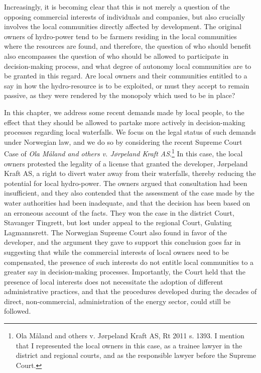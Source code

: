 Increasingly, it is becoming clear that this is not merely a question of the opposing commercial interests of individuals and companies, but also crucially involves the local communities directly affected by development. The original owners of hydro-power tend to be farmers residing in the local communities where the resources are found, and therefore, the question of who should benefit also encompasses the question of who should be allowed to participate in decision-making process, and what degree of autonomy local communities are to be granted in this regard. Are local owners and their communities entitled to a say in how the hydro-resource is to be exploited, or must they accept to remain passive, as they were rendered by the monopoly which used to be in place?

In this chapter, we address some recent demands made by local people, to the effect that they should be allowed to partake more actively in decision-making processes regarding local waterfalls. We focus on the legal status of such demands under Norwegian law, and we do so by considering the recent Supreme Court Case of \emph{Ola Måland and others v. Jørpeland Kraft AS}.\footnote{Ola M{\aa}land and others v. J{\o}rpeland Kraft AS, Rt 2011 s. 1393. I mention that I represented the local owners in this case, as a trainee lawyer in the district and regional courts, and as the responsible lawyer before the Supreme Court.} In this case, the local owners protested the legality of a license that granted the developer, Jørpeland Kraft AS, a right to divert water away from their waterfalls, thereby reducing the potential for local hydro-power. The owners argued that consultation had been insufficient, and they also contended that the assessment of the case made by the water authorities had been inadequate, and that the decision has been based on an erroneous account of the facts. They won the case in the district Court, Stavanger Tingrett, but lost under appeal to the regional Court, Gulating Lagmannsrett. The Norwegian Supreme Court also found in favor of the developer, and the argument they gave to support this conclusion goes far in suggesting that while the commercial interests of local owners need to be compensated, the presence of such interests do not entitle local communities to a greater say in decision-making processes. Importantly, the Court held that the presence of local interests does not necessitate the adoption of different administrative practices, and that the procedures developed during the decades of direct, non-commercial, administration of the energy sector, could still be followed.

